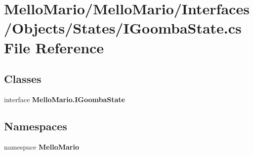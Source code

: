 \section{Mello\+Mario/\+Mello\+Mario/\+Interfaces/\+Objects/\+States/\+I\+Goomba\+State.cs File Reference}
\label{IGoombaState_8cs}
\subsection*{Classes}
\begin{DoxyCompactItemize}
\item 
interface \textbf{ Mello\+Mario.\+I\+Goomba\+State}
\end{DoxyCompactItemize}
\subsection*{Namespaces}
\begin{DoxyCompactItemize}
\item 
namespace \textbf{ Mello\+Mario}
\end{DoxyCompactItemize}
